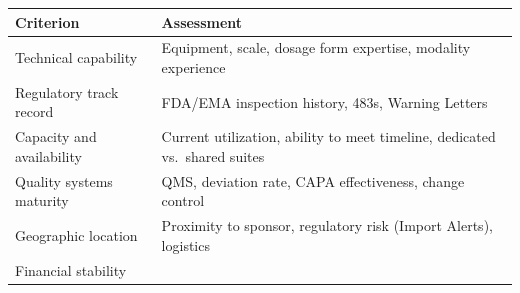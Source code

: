 \documentclass[
  11pt,
  a4paper,
]{report}
\begin{document}
\begin{longtable}[]{@{}ll@{}}
\toprule
\begin{minipage}[b]{0.47\columnwidth}\raggedright
Criterion\strut
\end{minipage} & \begin{minipage}[b]{0.47\columnwidth}\raggedright
Assessment\strut
\end{minipage}\tabularnewline
\midrule
\endhead
\begin{minipage}[t]{0.47\columnwidth}\raggedright
Technical capability\strut
\end{minipage} & \begin{minipage}[t]{0.47\columnwidth}\raggedright
Equipment, scale, dosage form expertise, modality experience\strut
\end{minipage}\tabularnewline
\begin{minipage}[t]{0.47\columnwidth}\raggedright
Regulatory track record\strut
\end{minipage} & \begin{minipage}[t]{0.47\columnwidth}\raggedright
FDA/EMA inspection history, 483s, Warning Letters\strut
\end{minipage}\tabularnewline
\begin{minipage}[t]{0.47\columnwidth}\raggedright
Capacity and availability\strut
\end{minipage} & \begin{minipage}[t]{0.47\columnwidth}\raggedright
Current utilization, ability to meet timeline, dedicated vs.~shared
suites\strut
\end{minipage}\tabularnewline
\begin{minipage}[t]{0.47\columnwidth}\raggedright
Quality systems maturity\strut
\end{minipage} & \begin{minipage}[t]{0.47\columnwidth}\raggedright
QMS, deviation rate, CAPA effectiveness, change control\strut
\end{minipage}\tabularnewline
\begin{minipage}[t]{0.47\columnwidth}\raggedright
Geographic location\strut
\end{minipage} & \begin{minipage}[t]{0.47\columnwidth}\raggedright
Proximity to sponsor, regulatory risk (Import Alerts), logistics\strut
\end{minipage}\tabularnewline
\begin{minipage}[t]{0.47\columnwidth}\raggedright
Financial stability\strut
\end{minipage} & \begin{minipage}[t]{0.47\columnwidth}\raggedright

\end{minipage}
\end{longtable}
\end{document}
